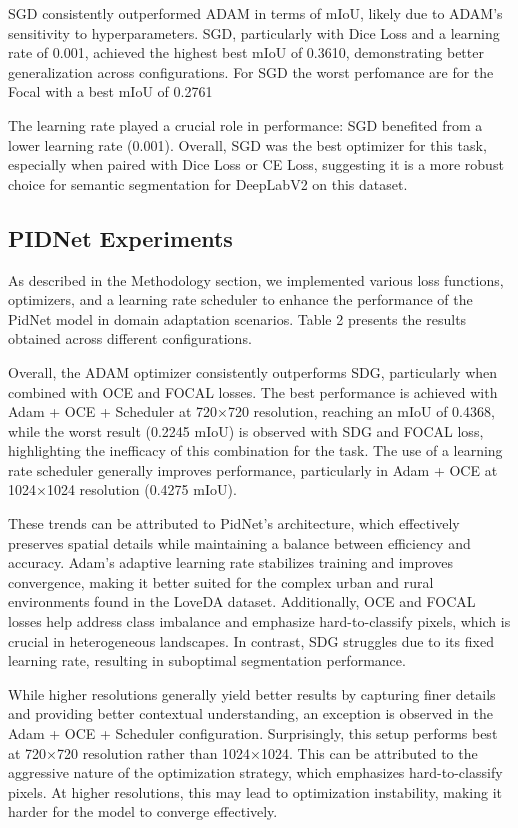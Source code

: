 \documentclass[10pt,twocolumn,letterpaper]{article}
\begin{document}
SGD consistently outperformed ADAM in terms of mIoU, likely due to ADAM’s sensitivity to hyperparameters. SGD, particularly with Dice Loss and a learning rate of 0.001, achieved the highest best mIoU of 0.3610, demonstrating better generalization across configurations. For SGD the worst perfomance are for the Focal with a best mIoU of 0.2761

The learning rate played a crucial role in performance: SGD benefited from a lower learning rate (0.001). Overall, SGD was the best optimizer for this task, especially when paired with Dice Loss or CE Loss, suggesting it is a more robust choice for semantic segmentation for DeepLabV2 on this dataset.
 
\subsection{PIDNet Experiments}

As described in the Methodology section, we implemented various loss functions, optimizers, and a learning rate scheduler to enhance the performance of the PidNet model in domain adaptation scenarios. Table 2 presents the results obtained across different configurations.

Overall, the ADAM optimizer consistently outperforms SDG, particularly when combined with OCE and FOCAL losses. The best performance is achieved with Adam + OCE + Scheduler at 720×720 resolution, reaching an mIoU of 0.4368, while the worst result (0.2245 mIoU) is observed with SDG and FOCAL loss, highlighting the inefficacy of this combination for the task. The use of a learning rate scheduler generally improves performance, particularly in Adam + OCE at 1024×1024 resolution (0.4275 mIoU).

These trends can be attributed to PidNet’s architecture, which effectively preserves spatial details while maintaining a balance between efficiency and accuracy. Adam’s adaptive learning rate stabilizes training and improves convergence, making it better suited for the complex urban and rural environments found in the LoveDA dataset. Additionally, OCE and FOCAL losses help address class imbalance and emphasize hard-to-classify pixels, which is crucial in heterogeneous landscapes. In contrast, SDG struggles due to its fixed learning rate, resulting in suboptimal segmentation performance.

While higher resolutions generally yield better results by capturing finer details and providing better contextual understanding, an exception is observed in the Adam + OCE + Scheduler configuration. Surprisingly, this setup performs best at 720×720 resolution rather than 1024×1024. This can be attributed to the aggressive nature of the optimization strategy, which emphasizes hard-to-classify pixels. At higher resolutions, this may lead to optimization instability, making it harder for the model to converge effectively.
\end{document}
